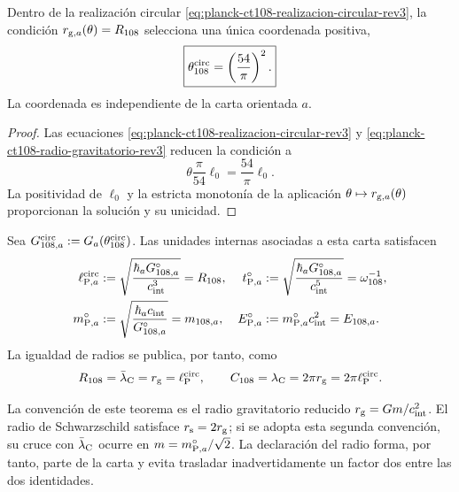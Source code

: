 \begin{proposition}
\label{prop:selector-circular-planck-ct108-rev3}
Dentro de la realización circular
\eqref{eq:planck-ct108-realizacion-circular-rev3}, la condición
\(r_{{\rm g},a}(\theta)=R_{108}\) selecciona una única coordenada
positiva,
\begin{equation}
 \boxed{\theta_{108}^{\rm circ}=\left(\frac{54}{\pi}\right)^2.}
 \label{eq:theta-circular-planck-ct108-rev3}
\end{equation}
La coordenada es independiente de la carta orientada \(a\).
\end{proposition}

\begin{proof}
Las ecuaciones
\eqref{eq:planck-ct108-realizacion-circular-rev3} y
\eqref{eq:planck-ct108-radio-gravitatorio-rev3} reducen la condición a
\[
 \theta\frac{\pi}{54}\ell_0=\frac{54}{\pi}\ell_0.
\]
La positividad de \(\ell_0\) y la estricta monotonía de la aplicación
\(\theta\mapsto r_{{\rm g},a}(\theta)\) proporcionan la solución y su
unicidad.
\end{proof}

Sea \(G_{108,a}^{\rm circ}:=G_a(\theta_{108}^{\rm circ})\). Las unidades internas
asociadas a esta carta satisfacen
\begin{align}
 \ell_{{\rm P},a}^{\rm circ}
 &:=\sqrt{\frac{\hbar_a G_{108,a}^{\circ}}{c_{\rm int}^{3}}}
 =R_{108},
 &
 t_{{\rm P},a}^{\circ}
 &:=\sqrt{\frac{\hbar_a G_{108,a}^{\circ}}{c_{\rm int}^{5}}}
 =\omega_{108}^{-1},
 \label{eq:planck-ct108-longitud-tiempo-rev3}\\
 m_{{\rm P},a}^{\circ}
 &:=\sqrt{\frac{\hbar_a c_{\rm int}}{G_{108,a}^{\circ}}}
 =m_{108,a},
 &
 E_{{\rm P},a}^{\circ}
 &:=m_{{\rm P},a}^{\circ}c_{\rm int}^{2}=E_{108,a}.
 \label{eq:planck-ct108-masa-energia-rev3}
\end{align}
La igualdad de radios se publica, por tanto, como
\begin{equation}
 R_{108}=\bar\lambda_{\rm C}=r_{\rm g}=\ell_{\rm P}^{\rm circ},
 \qquad
 C_{108}=\lambda_{\rm C}=2\pi r_{\rm g}=2\pi\ell_{\rm P}^{\rm circ}.
 \label{eq:planck-ct108-tres-lectores-rev3}
\end{equation}

La convención de este teorema es el radio gravitatorio reducido
\(r_{\rm g}=Gm/c_{\rm int}^{2}\). El radio de Schwarzschild satisface
\(r_{\rm s}=2r_{\rm g}\); si se adopta esta segunda convención, su cruce con
\(\bar\lambda_{\rm C}\) ocurre en
\(m=m_{{\rm P},a}^{\circ}/\sqrt2\). La declaración del radio forma, por
tanto, parte de la carta y evita trasladar inadvertidamente un factor dos
entre las dos identidades.

